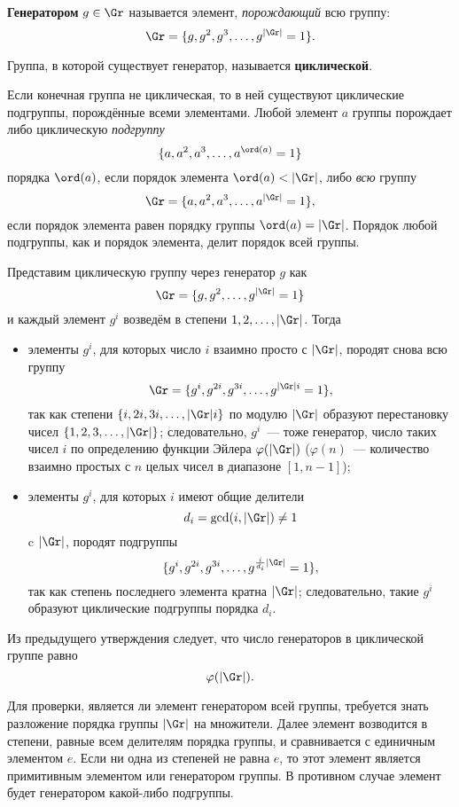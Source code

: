 \textbf{Генератором} $g \in \Gr$ называется элемент, \emph{порождающий} всю группу:
    \[ \Gr = \{g, g^2, g^3, \ldots, g^{|\Gr|} = 1\}. \]

Группа, в которой существует генератор, называется \textbf{циклической}.

Если конечная группа не циклическая, то в ней существуют циклические подгруппы, порождённые всеми элементами. Любой элемент $a$ группы порождает либо циклическую \emph{подгруппу}
    \[ \{ a, a^2, a^3, \dots, a^{\ord(a)} = 1 \} \]
порядка $\ord(a)$, если порядок элемента $\ord(a) < |\Gr|$, либо \emph{всю} группу
    \[ \Gr = \{ a, a^2, a^3, \dots, a^{|\Gr|} = 1 \}, \]
если порядок элемента равен порядку группы $\ord(a) = |\Gr|$. Порядок любой подгруппы, как и порядок элемента, делит порядок всей группы.

Представим циклическую группу через генератор $g$ как
    \[ \Gr = \{g, g^2, \ldots, g^{|\Gr|} = 1\} \]
и каждый элемент $g^i$ возведём в степени $1, 2, \ldots, |\Gr|$. Тогда
\begin{itemize}
    \item элементы $g^i$, для которых число $i$ взаимно просто с $|\Gr|$, породят снова всю группу
            \[ \Gr = \{ g^i, g^{2i}, g^{3i}, \dots, g^{|\Gr| i} = 1 \}, \]
        так как степени $\{i, 2i, 3i, \dots, |\Gr| i \}$ по модулю $|\Gr|$ образуют перестановку чисел $\{1, 2, 3, \dots, |\Gr|\}$; следовательно, $g^i$~--- тоже генератор, число таких чисел $i$ по определению функции Эйлера $\varphi(|\Gr|)$ ($\varphi(n)$~--- количество взаимно простых с $n$ целых чисел в диапазоне $[1,n-1]$);
    \item элементы $g^i$, для которых $i$ имеют общие делители
            \[ d_i = \gcd(i, |\Gr|) \neq 1 \]
        c $|\Gr|$, породят подгруппы
            \[ \{ g^i, g^{2i}, g^{3i}, \dots, g^{\frac{i}{d_i} |\Gr|} = 1\}, \]
        так как степень последнего элемента кратна $|\Gr|$; следовательно, такие $g^i$ образуют циклические подгруппы порядка $d_i$.
\end{itemize}

Из предыдущего утверждения следует, что число генераторов в циклической группе равно
    \[ \varphi(|\Gr|). \]

Для проверки, является ли элемент генератором всей группы, требуется знать разложение порядка группы $|\Gr|$ на множители. Далее элемент возводится в степени, равные всем делителям порядка группы, и сравнивается с единичным элементом $e$. Если ни одна из степеней не равна $e$, то этот элемент является примитивным элементом или генератором группы. В противном случае элемент будет генератором какой-либо подгруппы.

